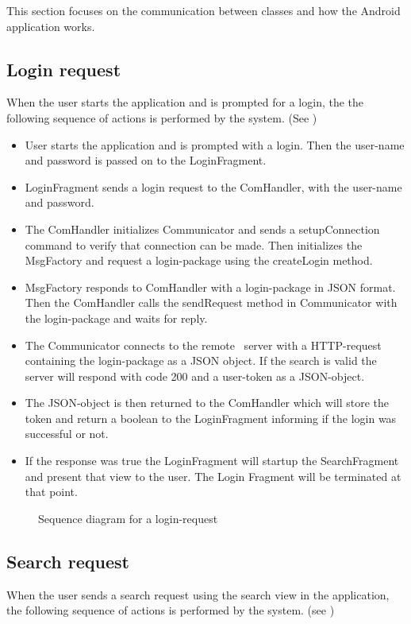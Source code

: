 This section focuses on the communication  between classes and how the Android application works.
\subsection{Login request}
	When the user starts the application and is prompted for a login, the the following sequence of actions is performed by the system. (See )	\\
	
	\begin{itemize}
		\item
			User starts the application and is prompted with a login.
			Then the user-name and password is passed on to the LoginFragment.
		\item
			LoginFragment sends a login request to the ComHandler, with the user-name and password.
		\item
			The ComHandler initializes Communicator and sends a setupConnection command to verify that connection can be made. Then initializes the MsgFactory and request a login-package using the createLogin method.
		\item
			MsgFactory responds to ComHandler with a login-package in JSON format. Then the ComHandler calls the sendRequest method in Communicator with the login-package and waits for reply.
		\item
			The Communicator connects to the remote \appName\ server with a HTTP-request containing the login-package as a JSON object. If the search is valid the server will respond with code 200 and a user-token as a JSON-object.
		\item
			The JSON-object is then returned to the ComHandler which will store the token and return a boolean to the LoginFragment informing if the login was successful or not.
		\item 
			If the response was true the LoginFragment will startup the SearchFragment and present that view to the user. The Login Fragment will be terminated at that point. 
			
	\end{itemize}

	\begin{figure}[h]
		\caption{Sequence diagram for a login-request}
		\label{fig:and_loginseq}
	\end{figure}
	
\subsection{Search request}
	When the user sends a search request using the search view in the application, the following sequence of actions is performed by the system.
	(see )
	
